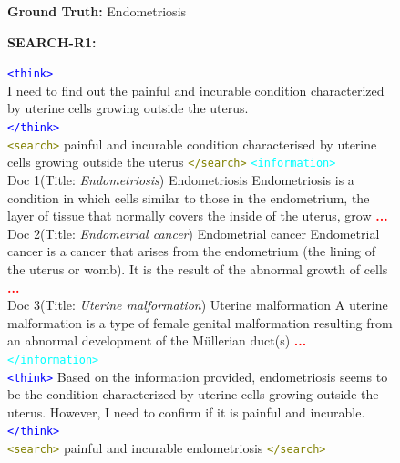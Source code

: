 \begin{figure}[h]
\centering
\begin{tcolorbox}[colback=white,colframe=black!60,title=\textbf{Question:} What is the painful and incurable so far condition characterised by uterine cells growing outside the uterus?]

\textbf{Ground Truth:}  Endometriosis

\vspace{0.5em}
\textbf{SEARCH-R1:}

\textcolor{blue}{\texttt{<think>}}\\
I need to find out the painful and incurable condition characterized by uterine cells growing outside the uterus.\\
\textcolor{blue}{\texttt{</think>}}
\\
\vspace{0.5em}
\textcolor{olive}{\texttt{<search>}} painful and incurable condition characterised by uterine cells growing outside the uterus \textcolor{olive}{\texttt{</search>}}
\vspace{0.5em}
\textcolor{cyan}{\texttt{<information>}}
\\
Doc 1(Title: \textit{Endometriosis}) Endometriosis Endometriosis is a condition in which cells similar to those in the endometrium, the layer of tissue that normally covers the inside of the uterus, grow  \textcolor{red}{\textbf{...}}\\
Doc 2(Title: \textit{Endometrial cancer}) Endometrial cancer Endometrial cancer is a cancer that arises from the endometrium (the lining of the uterus or womb). It is the result of the abnormal growth of cells \textcolor{red}{\textbf{...}}\\
Doc 3(Title: \textit{Uterine malformation}) Uterine malformation A uterine malformation is a type of female genital malformation resulting from an abnormal development of the Müllerian duct(s) \textcolor{red}{\textbf{...}}\\
\textcolor{cyan}{\texttt{</information>}}
\\
\vspace{0.5em}
\textcolor{blue}{\texttt{<think>}}
Based on the information provided, endometriosis seems to be the condition characterized by uterine cells growing outside the uterus. However, I need to confirm if it is painful and incurable.\textcolor{blue}{\texttt{</think>}}
\\
\vspace{0.5em}
\textcolor{olive}{\texttt{<search>}} painful and incurable endometriosis \textcolor{olive}{\texttt{</search>}}

\end{tcolorbox}
\end{figure}
